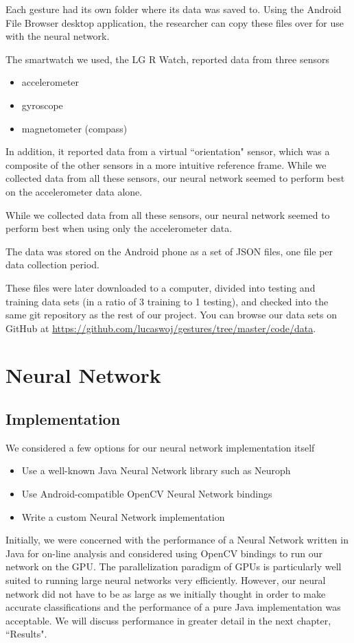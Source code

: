\documentclass{report}
\begin{document}
Each gesture had its own folder where its data was saved to. Using the Android File Browser desktop application, the researcher can copy these files over for use with the neural network.

The smartwatch we used, the LG R Watch, reported data from three sensors
\begin{itemize}
\item accelerometer
\item gyroscope
\item magnetometer (compass)
\end{itemize}
In addition, it reported data from a virtual ``orientation" sensor, which was a composite of the other sensors in a more intuitive reference frame. While we collected data from all these sensors, our neural network seemed to perform best on the accelerometer data alone.

While we collected data from all these sensors, our neural network seemed to perform best when using only the accelerometer data.

The data was stored on the Android phone as a set of JSON files, one file per data collection period. %

These files were later downloaded to a computer, divided into testing and training data sets (in a ratio of 3 training to 1 testing), and checked into the same git repository as the rest of our project. You can browse our data sets on GitHub at \url{https://github.com/lucaswoj/gestures/tree/master/code/data}.

\section{Neural Network}

\subsection{Implementation}
We considered a few options for our neural network implementation itself
\begin{itemize}
\item Use a well-known Java Neural Network library such as Neuroph
\item Use Android-compatible OpenCV Neural Network bindings
\item Write a custom Neural Network implementation
\end{itemize}

Initially, we were concerned with the performance of a Neural Network written in Java for on-line analysis and considered using OpenCV bindings to run our network on the GPU. The parallelization paradigm of GPUs is particularly well suited to running large neural networks very efficiently. However, our neural network did not have to be as large as we initially thought in order to make accurate classifications and the performance of a pure Java implementation was acceptable. We will discuss performance in greater detail in the next chapter, ``Results".
\end{document}
